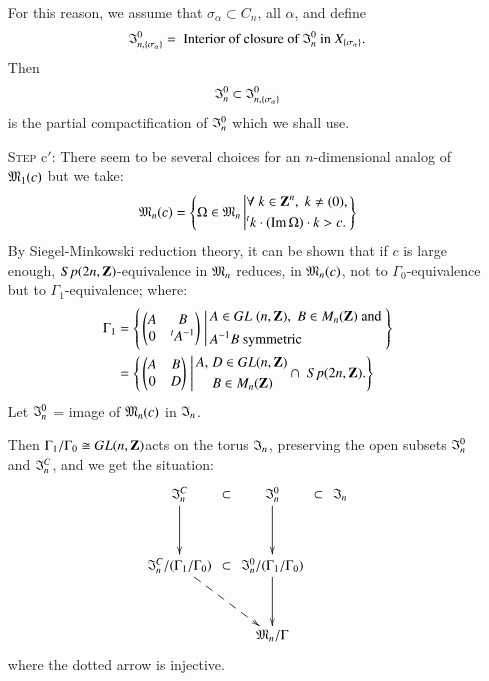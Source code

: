 \begin{itemize}
For this reason, we assume that $\sigma_\alpha  \subset C_n$, all $\alpha$, and define
$$
\mathfrak{I}^0_{n, \{\sigma_\alpha\}} = \text{ Interior of closure of } \mathfrak{I}^0_n \text{ in } X_{\{\sigma_\alpha\}}.
$$
Then 
$$
\mathfrak{I}^0_n \subset \mathfrak{I}^0_{n,\{\sigma_\alpha\}}
$$
is the partial compactification of $\mathfrak{I}^0_n$ which we shall use.

\item[\textsc{Step} c$'$:]  There seem to be several choices for an $n$-dimensional analog of $\mathfrak{M}_1(c)$ but we take:
$$
\mathfrak{M}_n(c) = 
\left\{\Omega \in \mathfrak{M}_n \left|
\begin{aligned}
&\forall \; k \in \mathbf{Z}^n, \; k \neq (0), \\
& {}^t k \cdot (\operatorname{Im} \Omega) \cdot k > c.
\end{aligned}
\right.
 \right\}
$$
By Siegel-Minkowski reduction theory, it can be shown that if $c$ is large enough, $Sp (2n, \mathbf{Z})$-equivalence in $\mathfrak{M}_n$ reduces, in $\mathfrak{M}_n (c)$, not to $\Gamma_0$-equivalence but to $\Gamma_1$-equivalence; where:
\begin{align*}
\Gamma_1 & = \left\{
\left. 
\begin{pmatrix}
A & B \\
0 & {}^t A^{-1}
\end{pmatrix} \;
\right|
\begin{aligned}
& A \in G L \; (n, \mathbf{Z}), \; B \in M_n (\mathbf{Z}) \text{ and }\\
& A^{-1} B \text{ symmetric}
\end{aligned} \right\}\\
& = \left\{
\left. 
\begin{pmatrix}
A &  B\\
0 & D
\end{pmatrix}\; 
\right|
\begin{aligned}
A, \;&  D \in G L (n, \mathbf{Z})\\
& B \in M_n (\mathbf{Z})
\end{aligned}
\cap \; Sp (2n, \mathbf{Z}).
\right\}
\end{align*}
Let $\mathfrak{I}^0_n$ = image of $\mathfrak{M}_n(c)$ in $\mathfrak{I}_n$.

Then  $\Gamma_1 / \Gamma_0 \cong G L (n, \mathbf{Z})$\pageoriginale acts on the torus $\mathfrak{I}_n$, preserving the open subsets $\mathfrak{I}^0_n$ and $\mathfrak{I}^C_n$, and we get the situation:
$$
\xymatrix@R=1.2cm@C=0.05cm{
\fI^C_n \ar[d] & \subset & \fI^0_n \ar[d] & \subset & \fI_n\\
\fI^C_n / (\Gamma_1 / \Gamma_0)  \ar@{-->}[drr] & \subset & \fI^0_n / (\Gamma_1 / \Gamma_0)\ar[d] & & \\
& & \fM_n/ \Gamma & & 
}
$$
where the dotted arrow is injective.


\end{itemize}
